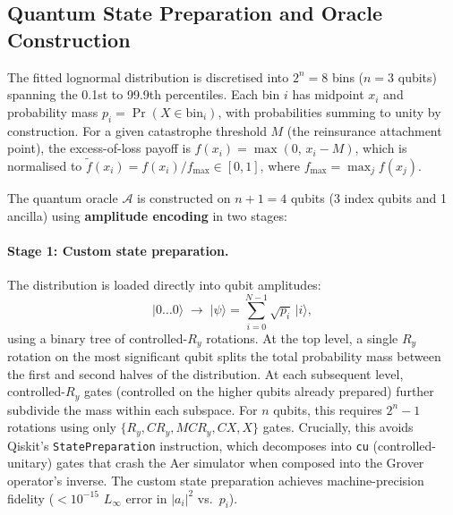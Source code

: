 \documentclass[11pt,a4paper]{article}
\begin{document}
\subsection{Quantum State Preparation and Oracle Construction}
\label{sec:oracle}

The fitted lognormal distribution is discretised into $2^n = 8$ bins ($n = 3$ qubits) spanning the 0.1st to 99.9th percentiles. Each bin $i$ has midpoint $x_i$ and probability mass $p_i = \Pr(X \in \text{bin}_i)$, with probabilities summing to unity by construction. For a given catastrophe threshold $M$ (the reinsurance attachment point), the excess-of-loss payoff is $f(x_i) = \max(0,\, x_i - M)$, which is normalised to $\tilde{f}(x_i) = f(x_i) / f_{\max} \in [0, 1]$, where $f_{\max} = \max_j f(x_j)$.

The quantum oracle $\mathcal{A}$ is constructed on $n + 1 = 4$ qubits (3 index qubits and 1 ancilla) using \textbf{amplitude encoding} in two stages:

\paragraph{Stage 1: Custom state preparation.} The distribution is loaded directly into qubit amplitudes:
\begin{equation}
|0\ldots 0\rangle \;\longrightarrow\; |\psi\rangle = \sum_{i=0}^{N-1} \sqrt{p_i}\,|i\rangle,
\label{eq:stateprep}
\end{equation}
using a binary tree of controlled-$R_y$ rotations. At the top level, a single $R_y$ rotation on the most significant qubit splits the total probability mass between the first and second halves of the distribution. At each subsequent level, controlled-$R_y$ gates (controlled on the higher qubits already prepared) further subdivide the mass within each subspace. For $n$ qubits, this requires $2^n - 1$ rotations using only $\{R_y, CR_y, MCR_y, CX, X\}$ gates. Crucially, this avoids Qiskit's \texttt{StatePreparation} instruction, which decomposes into \texttt{cu} (controlled-unitary) gates that crash the Aer simulator when composed into the Grover operator's inverse. The custom state preparation achieves machine-precision fidelity ($< 10^{-15}$ $L_\infty$ error in $|a_i|^2$ vs.\ $p_i$).
\end{document}
